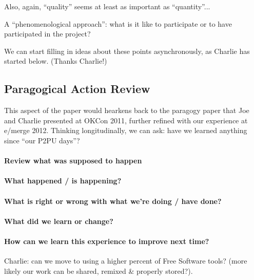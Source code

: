 \documentclass{acm_proc_article-sp}
\begin{document}
Also, again, ``quality'' seems at least as important as ``quantity''... 

A ``phenomenological approach'': what is it like to participate or to have participated in the project?


We can start filling in ideas about these points asynchronously, as Charlie has started below. (Thanks Charlie!)

\subsection{Paragogical Action Review}

This aspect of the paper would hearkens back to the paragogy paper
that Joe and Charlie presented at OKCon 2011, further refined with our
experience at e/merge 2012.  Thinking longitudinally, we can ask: have
we learned anything since ``our P2PU days''?

\paragraph{Review what was supposed to happen}

\paragraph{What happened / is happening?}

\paragraph{What is right or wrong with what we're doing / have done?}

\paragraph{What did we learn or change?}

\paragraph{How can we learn this experience to improve next time?}

Charlie: can we move to using a higher percent of Free Software tools?
(more likely our work can be shared, remixed \& properly stored?).

%
\end{document}
